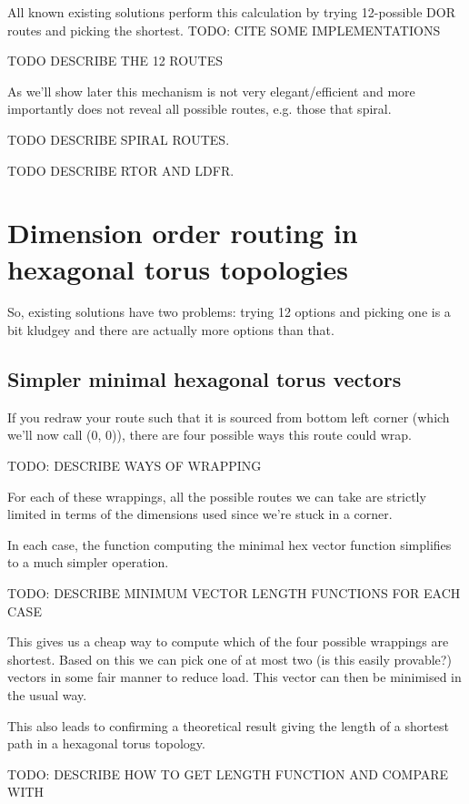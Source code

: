 			All known existing solutions perform this calculation by trying 12-possible
			DOR routes and picking the shortest. TODO: CITE SOME IMPLEMENTATIONS
			
			TODO DESCRIBE THE 12 ROUTES
			
			As we'll show later this mechanism is not very elegant/efficient and more
			importantly does not reveal all possible routes, e.g. those that spiral.
			
			TODO DESCRIBE SPIRAL ROUTES.
			
			TODO DESCRIBE RTOR AND LDFR.
		
	\section{Dimension order routing in hexagonal torus topologies}
		
		So, existing solutions have two problems: trying 12 options and picking one
		is a bit kludgey and there are actually more options than that.
		
		\subsection{Simpler minimal hexagonal torus vectors}
			
			If you redraw your route such that it is sourced from bottom left corner
			(which we'll now call (0, 0)), there are four possible ways this route
			could wrap.
			
			TODO: DESCRIBE WAYS OF WRAPPING
			
			For each of these wrappings, all the possible routes we can take are
			strictly limited in terms of the dimensions used since we're stuck in a
			corner.
			
			In each case, the function computing the minimal hex vector function
			simplifies to a much simpler operation.
			
			TODO: DESCRIBE MINIMUM VECTOR LENGTH FUNCTIONS FOR EACH CASE
			
			This gives us a cheap way to compute which of the four possible wrappings
			are shortest. Based on this we can pick one of at most two (is this
			easily provable?) vectors in some fair manner to reduce load. This vector
			can then be minimised in the usual way.
			
			This also leads to confirming a theoretical result giving the length of a
			shortest path in a hexagonal torus topology.
			
			TODO: DESCRIBE HOW TO GET LENGTH FUNCTION AND COMPARE WITH \cite{xiao04}
		
